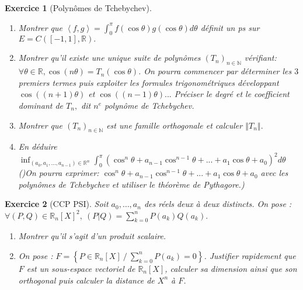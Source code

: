 \documentclass[12pt,a4paper]{article}
\newcommand{\R}{\mathbb{R}}
\newcommand{\N}{\mathbb{N}}
\theoremstyle{break}
\newtheorem{Exo}{Exercice}
\begin{document}
\begin{Exo}[Polynômes de Tchebychev]
\

\begin{enumerate}
\item Montrer que $\left\langle f,g\right\rangle =\int_{0}^{\pi }f\left(
\cos \theta \right) g\left( \cos \theta \right) d\theta $ d\'{e}finit un ps
sur $E=C\left( \left[ -1,1\right] ,\R\right) .$

\item Montrer qu'il existe une unique suite de polynômes $\left(
T_{n}\right) _{n\in \N}$ v\'{e}rifiant:
$
\forall \theta \in \R,\cos \left( n\theta \right) =T_{n}\left( \cos
\theta \right) 
$.
On pourra commencer par déterminer les $3$ premiers termes puis
exploiter les formules trigonométriques développant $\cos \left(
\left( n+1\right) \theta \right) $ et $\cos \left( \left( n-1\right) \theta
\right) ...$ Préciser le degré et le coefficient dominant de $T_{n},$
dit $n^{e}$ polynôme de Tchebychev.

\item Montrer que $\left( T_{n}\right) _{n\in \N}$ est une famille
orthogonale et calculer $\left\Vert T_{n}\right\Vert .$

\item En d\'{e}duire $\inf_{\left( a_{0},a_{1},...,a_{n-1}\right)
\in \R^n}\int_{0}^{\pi }\left( \cos ^{n}\theta +a_{n-1}\cos ^{n-1}\theta
+...+a_{1}\cos \theta +a_{0}\right) ^{2}d\theta $ ()On pourra exprimer: $\cos
^{n}\theta +a_{n-1}\cos ^{n-1}\theta +...+a_{1}\cos \theta +a_{0}$ avec les
polynômes de Tchebychev et utiliser le théorème de Pythagore.)
\end{enumerate}
\end{Exo}

\begin{Exo}[CCP PSI]
	Soit $a_0,\dots,a_n$ des réels deux à deux distincts. On pose :
	$\forall (P,Q)\in\mathbb R_n[X]^2,\ (P|Q)=\displaystyle\sum_{k=0}^nP(a_k)Q(a_k).$
	\begin{enumerate}
		\item
		Montrer qu'il s'agit d'un produit scalaire.
		\item
		On pose : $F=\left\{P\in\mathbb R_n[X]\ /\ \displaystyle\sum_{k=0}^nP(a_k)=0\right\}$.
			Justifier rapidement que $F$ est un sous-espace vectoriel de $\mathbb R_n[X]$, calculer sa dimension ainsi que son orthogonal puis calculer la distance de $X^n$ à $F$.
	\end{enumerate}
\end{Exo}
\end{document}
